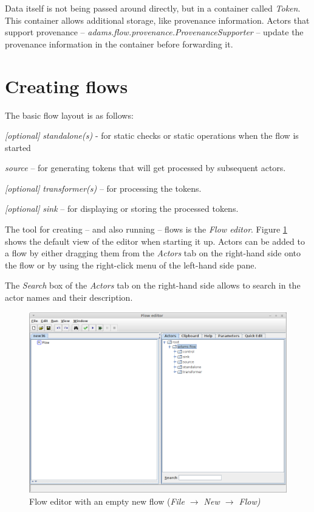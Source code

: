 \noindent Data itself is not being passed around directly, but in a container
called \textit{Token}. This container allows additional storage, like provenance
information. Actors that support provenance -- \textit{adams.flow.provenance.ProvenanceSupporter} --
update the provenance information in the container before forwarding it.

\newpage
\section{Creating flows}
The basic flow layout is as follows:
\begin{tight_itemize}
  \item \textit{[optional]} \textit{standalone(s)} - for static checks or static
  operations when the flow is started
  \item \textit{source} -- for generating tokens that will get processed by
  subsequent actors.
  \item \textit{[optional]} \textit{transformer(s)} -- for processing the
  tokens.
  \item \textit{[optional]} \textit{sink} -- for displaying or storing the
  processed tokens.
\end{tight_itemize}
The tool for creating -- and also running -- flows is the \textit{Flow editor}.
Figure \ref{floweditor-newflow} shows the default view of the editor when
starting it up. Actors can be added to a flow by either dragging them from the
\textit{Actors} tab on the right-hand side onto the flow or by using the
right-click menu of the left-hand side pane.

The \textit{Search} box of the \textit{Actors} tab on the right-hand side allows
to search in the actor names and their description.

\begin{figure}[htb]
  \centering
  \includegraphics[width=12.0cm]{images/floweditor-new.png}
  \caption{Flow editor with an empty new flow
  (\textit{File $\rightarrow$ New $\rightarrow$ Flow)}}
  \label{floweditor-newflow}
\end{figure}

